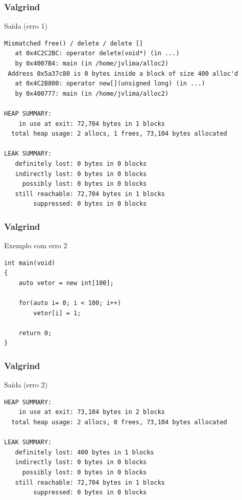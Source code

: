 \documentclass[xcolor={usenames,dvipsnames},12pt,presentation,aspectratio=169]{beamer}
\begin{document}
\begin{frame}[fragile]
  \frametitle{Valgrind}
  \vspace{-5mm}
  \begin{block}{Saída (erro 1)}
\begin{lstlisting}
Mismatched free() / delete / delete []
   at 0x4C2C2BC: operator delete(void*) (in ...)
   by 0x4007B4: main (in /home/jvlima/alloc2)
 Address 0x5a37c80 is 0 bytes inside a block of size 400 alloc'd
   at 0x4C2B800: operator new[](unsigned long) (in ...)
   by 0x400777: main (in /home/jvlima/alloc2)

HEAP SUMMARY:
    in use at exit: 72,704 bytes in 1 blocks
  total heap usage: 2 allocs, 1 frees, 73,104 bytes allocated

LEAK SUMMARY:
   definitely lost: 0 bytes in 0 blocks
   indirectly lost: 0 bytes in 0 blocks
     possibly lost: 0 bytes in 0 blocks
   still reachable: 72,704 bytes in 1 blocks
        suppressed: 0 bytes in 0 blocks
\end{lstlisting}
\end{block}
\end{frame}
\begin{frame}[fragile]
  \frametitle{Valgrind}
  \begin{block}{Exemplo com erro 2}
\begin{lstlisting}
int main(void)
{
    auto vetor = new int[100];

    for(auto i= 0; i < 100; i++)
        vetor[i] = 1;

    return 0;
}
\end{lstlisting}
\end{block}
\end{frame}
\begin{frame}[fragile]
  \frametitle{Valgrind}
  \begin{block}{Saída (erro 2)}
\begin{lstlisting}
HEAP SUMMARY:
    in use at exit: 73,104 bytes in 2 blocks
  total heap usage: 2 allocs, 0 frees, 73,104 bytes allocated

LEAK SUMMARY:
   definitely lost: 400 bytes in 1 blocks
   indirectly lost: 0 bytes in 0 blocks
     possibly lost: 0 bytes in 0 blocks
   still reachable: 72,704 bytes in 1 blocks
        suppressed: 0 bytes in 0 blocks
\end{lstlisting}
\end{block}
\end{frame}
\end{document}
